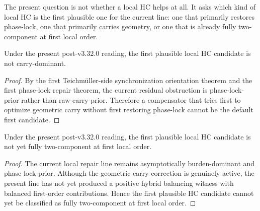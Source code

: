 \begin{remark}
\label{rem:what-the-hc-classification-is-trying-to-decide}
The present question is not whether a local HC helps at all. It asks which kind of local HC is the first plausible one for the current line: one that primarily restores phase-lock, one that primarily carries geometry, or one that is already fully two-component at first local order.
\end{remark}

\begin{proposition}
\label{prop:current-line-is-not-carry-dominant-on-the-hc-side}
Under the present post-v3.32.0 reading, the first plausible local HC candidate is not carry-dominant.
\end{proposition}

\begin{proof}
By the first Teichm\"uller-side synchronization orientation theorem and the first phase-lock repair theorem, the current residual obstruction is phase-lock-prior rather than raw-carry-prior. Therefore a compensator that tries first to optimize geometric carry without first restoring phase-lock cannot be the default first candidate.
\end{proof}

\begin{proposition}
\label{prop:current-line-is-not-yet-fully-two-component-on-the-hc-side}
Under the present post-v3.32.0 reading, the first plausible local HC candidate is not yet fully two-component at first local order.
\end{proposition}

\begin{proof}
The current local repair line remains asymptotically burden-dominant and phase-lock-prior. Although the geometric carry correction is genuinely active, the present line has not yet produced a positive hybrid balancing witness with balanced first-order contributions. Hence the first plausible HC candidate cannot yet be classified as fully two-component at first local order.
\end{proof}

